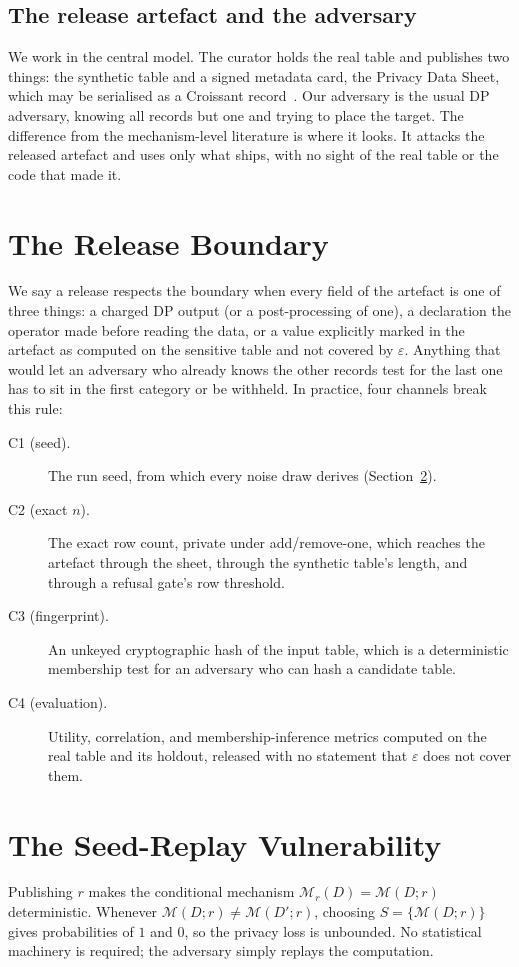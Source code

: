 \documentclass[conference]{IEEEtran}
\newcommand{\eps}{\varepsilon}
\begin{document}
\subsection{The release artefact and the adversary}
We work in the central model. The curator holds the real table and publishes two things: the synthetic
table and a signed metadata card, the Privacy Data Sheet, which may be serialised as a Croissant
record~\cite{croissant}. Our adversary is the usual DP adversary, knowing all records but one and
trying to place the target. The difference from the mechanism-level literature is where it looks. It
attacks the released artefact and uses only what ships, with no sight of the real table or the code
that made it.

\section{The Release Boundary}\label{sec:boundary}
We say a release respects the boundary when every field of the artefact is one of three things: a
charged DP output (or a post-processing of one), a declaration the operator made before reading the
data, or a value explicitly marked in the artefact as computed on the sensitive table and not covered
by $\eps$. Anything that would let an adversary who already knows the other records test for the last
one has to sit in the first category or be withheld. In practice, four channels break this rule:

\begin{description}
\item[C1 (seed).] The run seed, from which every noise draw derives (Section~\ref{sec:seed}).
\item[C2 (exact $n$).] The exact row count, private under add/remove-one, which reaches the artefact
through the sheet, through the synthetic table's length, and through a refusal gate's row threshold.
\item[C3 (fingerprint).] An unkeyed cryptographic hash of the input table, which is a deterministic
membership test for an adversary who can hash a candidate table.
\item[C4 (evaluation).] Utility, correlation, and membership-inference metrics computed on the real
table and its holdout, released with no statement that $\eps$ does not cover them.
\end{description}

\section{The Seed-Replay Vulnerability}\label{sec:seed}
Publishing $r$ makes the conditional mechanism $\mathcal{M}_r(D)=\mathcal{M}(D;r)$ deterministic.
Whenever $\mathcal{M}(D;r)\neq\mathcal{M}(D';r)$, choosing $S=\{\mathcal{M}(D;r)\}$ gives probabilities
of $1$ and $0$, so the privacy loss is unbounded. No statistical machinery is required; the adversary
simply replays the computation.
\end{document}
